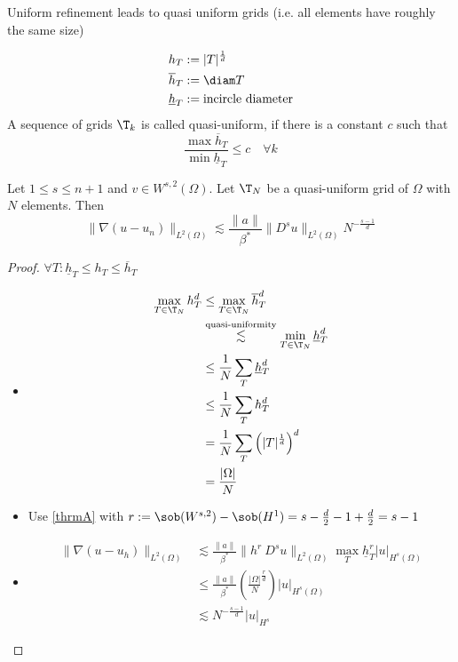 Uniform refinement leads to quasi uniform grids (i.e. all elements have roughly the same size)
\begin{definition}
	\begin{align*}
		h_{T} &:= |T|^{\frac{1}{d}}\\
		\overline{h}_{T} &:= \diam T \\
		\underline{h}_{T} &:= \text{incircle diameter}
	\end{align*}
	A sequence of grids $\T_{k}$ is called quasi-uniform, if there is a constant $c$ such that 
	\begin{equation*}
		\frac{\max \overline{h}_{T}}{\min \underline{h}_{T}} \leq c \quad \forall k
	\end{equation*}
\end{definition}
\begin{korollar}\label{corollB}
	Let $1 \leq s \leq n+1$ and $v \in W^{s,2}(\Omega)$.
	Let $\T_{N}$ be a quasi-uniform grid of $\Omega$ with $N$ elements.
	Then 
	\begin{equation*}
		\|\nabla ( u -u_{n})\|_{L^2(\Omega)} \lesssim \frac{ \|a\|}{\beta^*} \|D^su\|_{L^2(\Omega)} N^{-\frac{s-1}{d}}
	\end{equation*}
\end{korollar}
\begin{proof}
	$\forall T: \underline{h}_{T} \leq h_{T} \leq \overline{h}_{T}$
	\begin{itemize}
		\item 
			\begin{align*}
				\max_{T \in \T_{N}} h_{T}^d &\leq \max_{T\in \T_{N}}  \overline{h}^d_{T} \\
											&\overset{\text{quasi-uniformity}}{\lesssim} \min_{T\in\T_{N}} \underline{h}_{T}^d\\
											&\leq \frac{1}{N} \sum\limits_{T} \underline{h}_{T}^d\\
											&\leq \frac{1}{N} \sum\limits_{T} h_{T}^d\\
											&= \frac{1}{N} \sum\limits_{T} \left( |T|^{\frac{1}{d}} \right)^d\\
											&= \frac{|\Omega|}{N}
			\end{align*}
		\item Use \eqref{thrmA} with $r:= \sob(W^{s,2}) - \sob(H^1) = s-\frac{d}{2} - 1 + \frac{d}{2} = s -1$
		\item 
			\begin{align*}
				\|\nabla(u-u_{h})\|_{L^2(\Omega)} &\lesssim \frac{ \|a\|}{\beta^*} \|h^r\ D^su\|_{L^{2}(\Omega)} \max_{T} \underline{h}^r_{T} |u|_{H^s(\Omega)}\\
												  &\leq\frac{ \|a\|}{\beta^*} \left( \frac{|\Omega|}{N}^{\frac{r}{d}} \right) |u|_{H^s(\Omega)}\\
												  &\lesssim N^{-\frac{s-1}{d}} |u|_{H^s}
			\end{align*}
	\end{itemize}
\end{proof}
